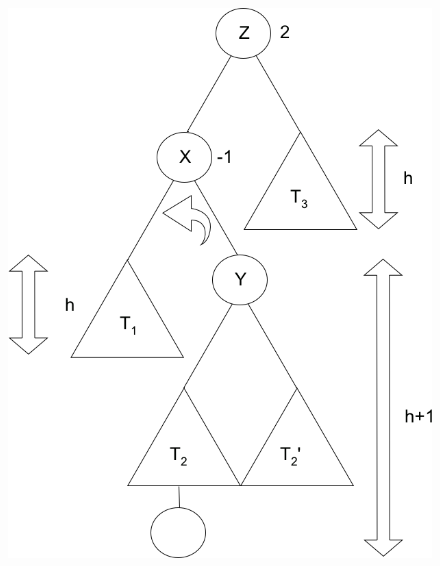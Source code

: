 \begin{minipage}[t]{0.3\textwidth}
\begin{figure}[H]
\includegraphics[width=\textwidth,left]{11/Grafik/img5_doppelRotation_2.png}\\
\end{figure}
\end{minipage}%
%
